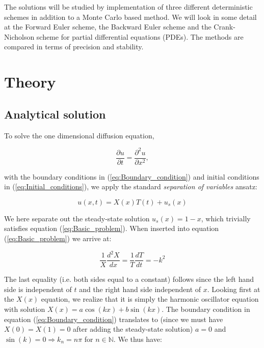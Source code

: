 \documentclass[a4paper, 11pt, notitlepage,english]{article}
\begin{document}
The solutions will be studied by implementation of three different deterministic schemes in addition to a Monte Carlo based method. We will look in some detail at the Forward Euler scheme, the Backward Euler scheme and the Crank-Nicholson scheme for partial differential equations (PDEs). The methods are compared in terms of precision and stability. 

\section{Theory}

\subsection{Analytical solution}
To solve the one dimensional diffusion equation, 

\begin{equation}
\frac{\partial u}{\partial t} = \frac{\partial^2 u}{\partial x^2},
\label{eq:Basic_problem}
\end{equation}

with the boundary conditions in (\ref{eq:Boundary_condition}) and initial conditions in (\ref{eq:Initial_conditions}), we apply the standard \emph{separation of variables} ansatz:

\begin{equation}
 u(x,t) = X(x)T(t) + u_s(x)
\label{eq:Separation of variables}
\end{equation}

We here separate out the steady-state solution $u_s(x) = 1-x$, which trivially satisfies equation (\ref{eq:Basic_problem}). When inserted into equation (\ref{eq:Basic_problem}) we arrive at:

\begin{equation}
\frac{1}{X} \frac{d^2 X}{dx} = \frac{1}{T}\frac{dT}{dt} = -k^2
\label{eq:Separated_equation}
\end{equation}

The last equality (i.e. both sides equal to a constant) follows since the left hand side is independent of $t$ and the right hand side independent of $x$. Looking first at the $X(x)$ equation, we realize that it is simply the harmonic oscillator equation with solution $X(x) = a\cos(kx) + b\sin(kx)$. The boundary condition in equation (\ref{eq:Boundary_condition}) translates to (since we must have $X(0) = X(1) = 0$ after adding the steady-state solution) $a = 0$ and $\sin(k) = 0 \Rightarrow k_n = n\pi$ for $n \in \mathbb{N}$. We thus have:
\end{document}
